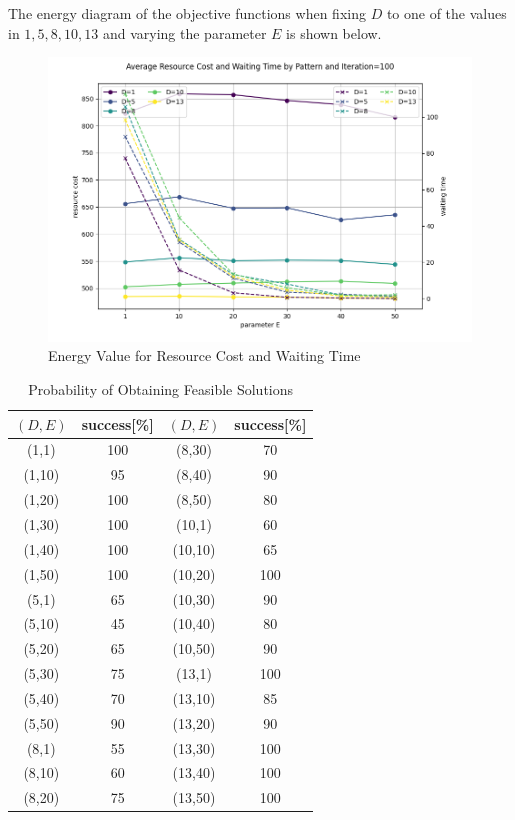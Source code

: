 \documentclass[conference]{IEEEtran}
\begin{document}
The energy diagram of the objective functions when fixing $D$ to one of the values in ${1, 5, 8, 10, 13}$ and varying the parameter $E$ is shown below.

\begin{figure}[htbp]
\centerline{\includegraphics[scale=0.4]{./fig/D.pdf}}
\caption{Energy Value for Resource Cost and Waiting Time}
\label{fig2}
\end{figure}

\begin{table}[h] 
\centering 
\caption{Probability of Obtaining Feasible Solutions} 
\label{feasible} 
\begin{tabular}{|c|c|c|c|} \hline 
$(D,E)$ & success[\%] & $(D,E)$ & success[\%] \\ \hline 
(1,1) & 100 & (8,30) & 70 \\ \hline 
(1,10) & 95 & (8,40) & 90 \\ \hline 
(1,20) & 100 & (8,50) & 80 \\ \hline 
(1,30) & 100 & (10,1) & 60 \\ \hline 
(1,40) & 100 & (10,10) & 65 \\ \hline 
(1,50) & 100 & (10,20) & 100 \\ \hline 
(5,1) & 65 & (10,30) & 90 \\ \hline
 (5,10) & 45 & (10,40) & 80 \\ \hline
 (5,20) & 65 & (10,50) & 90 \\ \hline
 (5,30) & 75 & (13,1) & 100 \\ \hline 
 (5,40) & 70 & (13,10) & 85 \\ \hline
 (5,50) & 90 & (13,20) & 90 \\ \hline
 (8,1) & 55 & (13,30) & 100 \\ \hline
 (8,10) & 60 & (13,40) & 100 \\ \hline 
 (8,20) & 75 & (13,50) & 100 \\ \hline
 \end{tabular} 
 \end{table}
\end{document}
